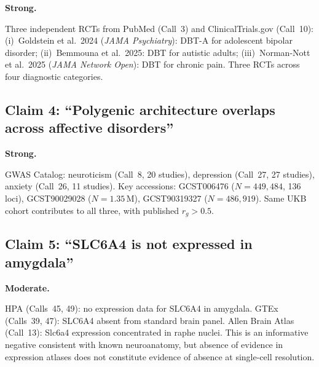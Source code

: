 \begin{description}[style=nextline, nosep]
  \item[Grade] \textbf{Strong.}
  \item[Evidence chain]
    Three independent RCTs from PubMed (Call~3) and ClinicalTrials.gov
    (Call~10):
    (i)~Goldstein et al.\ 2024 (\emph{JAMA Psychiatry}): DBT-A for
    adolescent bipolar disorder;
    (ii)~Bemmouna et al.\ 2025: DBT for autistic adults;
    (iii)~Norman-Nott et al.\ 2025 (\emph{JAMA Network Open}): DBT for
    chronic pain.  Three RCTs across four diagnostic categories.
\end{description}

\subsection*{Claim 4: ``Polygenic architecture overlaps across affective
disorders''}

\begin{description}[style=nextline, nosep]
  \item[Grade] \textbf{Strong.}
  \item[Evidence chain]
    GWAS Catalog: neuroticism (Call~8, 20 studies), depression (Call~27,
    27 studies), anxiety (Call~26, 11 studies).  Key accessions:
    GCST006476 ($N{=}449{,}484$, 136 loci), GCST90029028
    ($N{=}1.35$\,M), GCST90319327 ($N{=}486{,}919$).  Same UKB cohort
    contributes to all three, with published $r_g > 0.5$.
\end{description}

\subsection*{Claim 5: ``SLC6A4 is not expressed in amygdala''}

\begin{description}[style=nextline, nosep]
  \item[Grade] \textbf{Moderate.}
  \item[Evidence chain]
    HPA (Calls~45, 49): no expression data for SLC6A4 in amygdala.
    GTEx (Calls~39, 47): SLC6A4 absent from standard brain panel.
    Allen Brain Atlas (Call~13): Slc6a4 expression concentrated in raphe
    nuclei.  This is an informative negative consistent with known
    neuroanatomy, but absence of evidence in expression atlases does not
    constitute evidence of absence at single-cell resolution.
\end{description}

